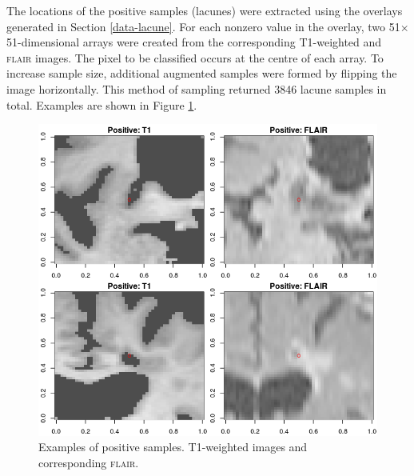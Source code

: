 The locations of the positive samples (lacunes) were extracted using the overlays generated in Section \ref{data-lacune}. For each nonzero value in the overlay, two 51$\times$51-dimensional arrays were created from the corresponding T1-weighted and \textsc{flair} images. The pixel to be classified occurs at the centre of each array. To increase sample size, additional augmented samples were formed by flipping the image horizontally. This method of sampling returned 3846 lacune samples in total. Examples are shown in Figure \ref{data-positives}.

\begin{figure}[ht]
\centering
\includegraphics[width=\linewidth]{Images/6_positives.png}
\caption{Examples of positive samples. T1-weighted images and corresponding \textsc{flair}.}
\label{data-positives}
\end{figure}


